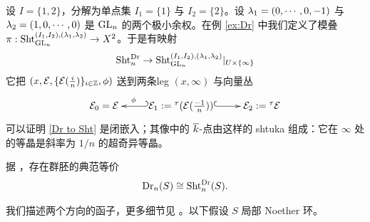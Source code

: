 设 $I=\{1,2\}$，分解为单点集 $I_{1}=\{1\}$ 与 $I_{2}=\{2\}$。设 $\lambda_{1}=(0,\cdots,0,-1)$ 与 $\lambda_{2}=(1,0,\cdots ,0)$ 是 $\textup{GL}_{n}$ 的两个极小余权。在例 \ref{ex:Dr} 中我们定义了模叠 $\pi: \textup{Sht}^{(I_{1},I_{2}), (\lambda_{1},\lambda_{2})}_{\textup{GL}_{n}} \to X^{2}$。于是有映射
\begin{equation}\label{Dr to Sht}
\textup{Sht}_{n}^{\mathrm{Dr}}\to \textup{Sht}^{(I_{1},I_{2}), (\lambda_{1},\lambda_{2})}_{\textup{GL}_{n}}|_{U\times\{\infty\}}
\end{equation}
它把 $(x, \mathcal{E}, \{\mathcal{E}(\frac{i}{n})\}_{i\in \mathbb{Z}}, \phi)$ 送到两条leg $(x, \infty)$ 与向量丛
\begin{equation*}
\xymatrix{\cE_{0}=\cE & \cE_{1}:={}^{\t}(\cE(\frac{-1}{n}))\ar@{_{(}->}[l]_-{\phi}\ar@{^{(}->}[r] & \cE_{2}:={}^{\t}\cE}
\end{equation*}
可以证明 \eqref{Dr to Sht} 是闭嵌入；其像中的 $\overline k$-点由这样的 shtuka 组成：它在 $\infty$ 处的等晶是斜率为 $1/n$ 的超奇异等晶。

\label{sss:dict}
据 \cite{Mum}，存在群胚的典范等价
\begin{equation*}
\mathrm{Dr}_{n}(S)\cong \textup{Sht}^{\mathrm{Dr}}_{n}(S).
\end{equation*}

我们描述两个方向的函子，更多细节见 \cite[Chapter 6]{Goss}。以下假设 $S$ 局部 Noether 环。

